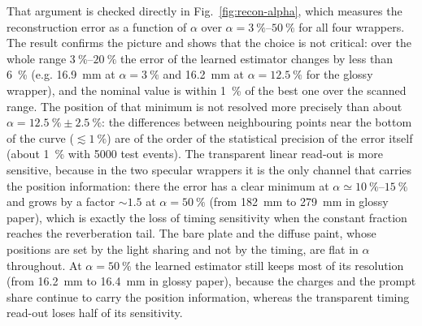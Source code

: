 \documentclass[11pt,a4paper]{article}
\begin{document}
That argument is checked directly in Fig.~\ref{fig:recon-alpha}, which
measures the reconstruction error as a function of $\alpha$ over
$\alpha = \SIrange{3}{50}{\percent}$ for all four wrappers.  The result
confirms the picture and shows that the choice is not critical: over the whole
range $\SIrange{3}{20}{\percent}$ the error of the learned estimator changes by
less than \SI{6}{\percent} (e.g. \SI{16.9}{\milli\meter} at
$\alpha = \SI{3}{\percent}$ and \SI{16.2}{\milli\meter} at
$\alpha = \SI{12.5}{\percent}$ for the glossy wrapper), and the nominal value
is within \SI{1}{\percent} of the best one over the scanned range.  The
position of that minimum is not resolved more precisely than about
$\alpha = \SI{12.5}{\percent} \pm \SI{2.5}{\percent}$: the differences between
neighbouring points near the bottom of the curve ($\lesssim \SI{1}{\percent}$)
are of the order of the statistical precision of the error itself (about
\SI{1}{\percent} with \num{5000} test events).  The transparent linear
read-out is more sensitive,
because in the two specular wrappers it is the only channel that carries the
position information: there the error has a clear minimum at
$\alpha \simeq \SIrange{10}{15}{\percent}$ and grows by a factor
$\sim 1.5$ at $\alpha = \SI{50}{\percent}$ (from \SI{182}{\milli\meter} to
\SI{279}{\milli\meter} in glossy paper), which is exactly the loss of timing
sensitivity when the constant fraction reaches the reverberation tail.  The
bare plate and the diffuse paint, whose positions are set by the light
sharing and not by the timing, are flat in $\alpha$ throughout.  At
$\alpha = \SI{50}{\percent}$ the learned estimator still keeps most of its
resolution (from \SI{16.2}{\milli\meter} to \SI{16.4}{\milli\meter} in glossy
paper), because the charges and the prompt share continue to carry the
position information, whereas the transparent timing read-out loses half of
its sensitivity.
\end{document}
